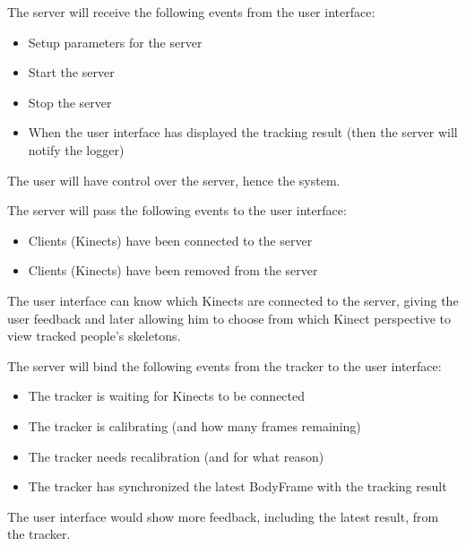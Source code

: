 The server will receive the following events from the user interface:

\begin{itemize}
  \item Setup parameters for the server
  \item Start the server
  \item Stop the server
  \item When the user interface has displayed the tracking result (then the server will notify the logger)
\end{itemize}

The user will have control over the server, hence the system.

The server will pass the following events to the user interface:

\begin{itemize}
  \item Clients (Kinects) have been connected to the server
  \item Clients (Kinects) have been removed from the server
\end{itemize}

The user interface can know which Kinects are connected to the server, giving the user feedback and later allowing him to choose from which Kinect perspective to view tracked people's skeletons.

The server will bind the following events from the tracker to the user interface:

\begin{itemize}
  \item The tracker is waiting for Kinects to be connected
  \item The tracker is calibrating (and how many frames remaining)
  \item The tracker needs recalibration (and for what reason)
  \item The tracker has synchronized the latest BodyFrame with the tracking result 
\end{itemize}

The user interface would show more feedback, including the latest result, from the tracker.

